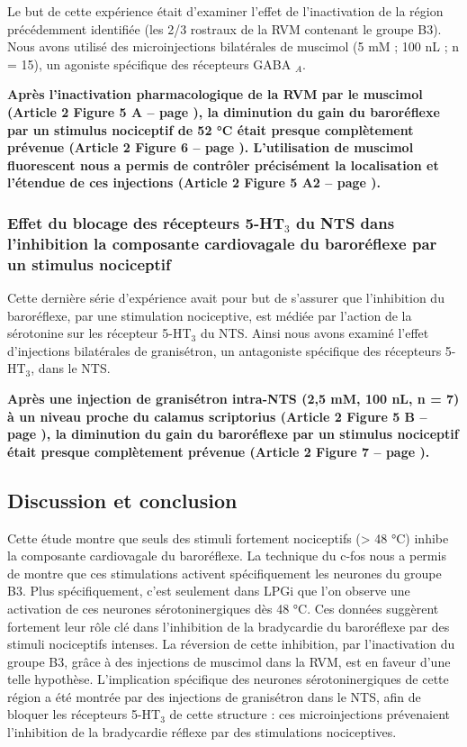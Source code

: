 \documentclass[a4paper,12pt,twoside]{report}
\begin{document}
Le but de cette expérience était d'examiner l'effet de l'inactivation de la région précédemment identifiée (les 2/3 rostraux de la RVM contenant le groupe B3). Nous avons utilisé des microinjections bilatérales de muscimol (5 mM ; 100 nL ; n = 15), un agoniste spécifique des récepteurs GABA $_{A}$.

\textbf{Après l’inactivation pharmacologique de la RVM par le muscimol (Article 2 Figure 5 A – page \pageref{Article2-FIG5}), la diminution du gain du baroréflexe par un stimulus nociceptif de 52 °C était presque complètement prévenue (Article 2 Figure 6 – page \pageref{Article2-FIG6}). L’utilisation de muscimol fluorescent nous a permis de contrôler précisément la localisation et l'étendue de ces injections (Article 2 Figure 5 A2 – page \pageref{Article2-FIG5}).}

\subsubsection{Effet du blocage des récepteurs 5-HT$_{3}$ du NTS dans l’inhibition la composante cardiovagale du baroréflexe par un stimulus nociceptif}

Cette dernière série d'expérience avait pour but de s’assurer que l'inhibition du baroréflexe, par une stimulation nociceptive, est médiée par l'action de la sérotonine sur les récepteur 5-HT$_{3}$ du NTS. Ainsi nous avons examiné l'effet d'injections bilatérales de granisétron, un antagoniste spécifique des récepteurs 5-HT$_{3}$, dans le NTS.

\textbf{Après une injection de granisétron intra-NTS (2,5 mM, 100 nL, n = 7) à un niveau proche du calamus scriptorius (Article 2 Figure 5 B – page \pageref{Article2-FIG5}), la diminution du gain du baroréflexe par un stimulus nociceptif était presque complètement prévenue (Article 2 Figure 7 – page \pageref{Article2-FIG7}).}

\subsection{Discussion et conclusion}

Cette étude montre que seuls des stimuli fortement nociceptifs (> 48 °C) inhibe la composante cardiovagale du baroréflexe. La technique du c-fos nous a permis de montre que ces stimulations activent spécifiquement les neurones du groupe B3. Plus spécifiquement, c’est seulement dans LPGi que l’on observe une activation de ces neurones sérotoninergiques dès 48 °C. Ces données suggèrent fortement leur rôle clé dans l’inhibition de la bradycardie du baroréflexe par des stimuli nociceptifs intenses. La réversion de cette inhibition, par l’inactivation du groupe B3, grâce à des injections de muscimol dans la RVM, est en faveur d’une telle hypothèse. L’implication spécifique des neurones sérotoninergiques de cette région a été montrée par des injections de granisétron dans le NTS, afin de bloquer les récepteurs 5-HT$_{3}$ de cette structure : ces microinjections prévenaient l’inhibition de la bradycardie réflexe par des stimulations nociceptives. 
\end{document}
